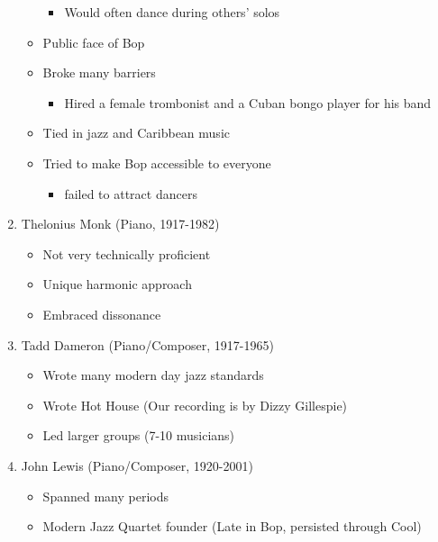 \documentclass[]{article}
\providecommand{\tightlist}{%
  \setlength{\itemsep}{0pt}\setlength{\parskip}{0pt}}
\begin{document}
\begin{enumerate}
\begin{itemize}
    \begin{itemize}
    \tightlist
    \item
      Would often dance during others' solos
    \end{itemize}
  \item
    Public face of Bop
  \item
    Broke many barriers

    \begin{itemize}
    \tightlist
    \item
      Hired a female trombonist and a Cuban bongo player for his band
    \end{itemize}
  \item
    Tied in jazz and Caribbean music
  \item
    Tried to make Bop accessible to everyone

    \begin{itemize}
    \tightlist
    \item
      failed to attract dancers
    \end{itemize}
  \end{itemize}
\item
  Thelonius Monk (Piano, 1917-1982)

  \begin{itemize}
  \tightlist
  \item
    Not very technically proficient
  \item
    Unique harmonic approach
  \item
    Embraced dissonance
  \end{itemize}
\item
  Tadd Dameron (Piano/Composer, 1917-1965)

  \begin{itemize}
  \tightlist
  \item
    Wrote many modern day jazz standards
  \item
    Wrote Hot House (Our recording is by Dizzy Gillespie)
  \item
    Led larger groups (7-10 musicians)
  \end{itemize}
\item
  John Lewis (Piano/Composer, 1920-2001)

  \begin{itemize}
  \tightlist
  \item
    Spanned many periods
  \item
    Modern Jazz Quartet founder (Late in Bop, persisted through Cool)


\end{itemize}
\end{enumerate}
\end{document}
